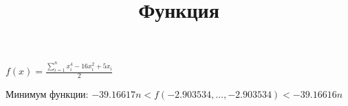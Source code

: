 \documentclass{article}
\title{Функция}
\author{}
\date{}
\begin{document}
\maketitle

\(
f(x)=\frac{\sum_{i=1}^{n}x_{i}^{4}-16x_{i}^{2}+5x_i}{2}
\)

Минимум функции:
\(
-39.16617n < f(-2.903534, \dots, -2.903534) < -39.16616n
\)
\end{document}
